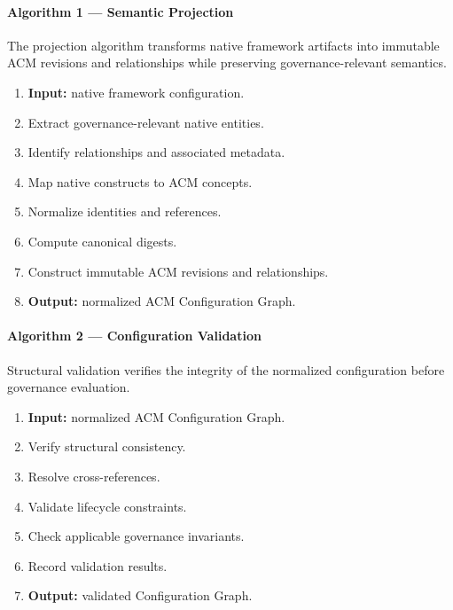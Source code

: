 \documentclass[10pt]{article}
\begin{document}
\paragraph{Algorithm 1 --- Semantic Projection}

The projection algorithm transforms native framework artifacts into immutable
ACM revisions and relationships while preserving governance-relevant semantics.

\begin{algorithm}[t]
	\caption{Semantic Projection}
	\begin{enumerate}
		\item \textbf{Input:} native framework configuration.
		\item Extract governance-relevant native entities.
		\item Identify relationships and associated metadata.
		\item Map native constructs to ACM concepts.
		\item Normalize identities and references.
		\item Compute canonical digests.
		\item Construct immutable ACM revisions and relationships.
		\item \textbf{Output:} normalized ACM Configuration Graph.
	\end{enumerate}
\end{algorithm}

\paragraph{Algorithm 2 --- Configuration Validation}

Structural validation verifies the integrity of the normalized configuration
before governance evaluation.

\begin{algorithm}[t]
	\caption{Configuration Validation}
	\begin{enumerate}
		\item \textbf{Input:} normalized ACM Configuration Graph.
		\item Verify structural consistency.
		\item Resolve cross-references.
		\item Validate lifecycle constraints.
		\item Check applicable governance invariants.
		\item Record validation results.
		\item \textbf{Output:} validated Configuration Graph.
	\end{enumerate}
\end{algorithm}
\end{document}
